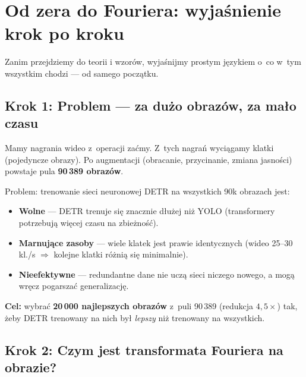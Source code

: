 
\section{Od zera do Fouriera: wyjaśnienie krok po kroku}
\label{sec:krok_po_kroku}

Zanim przejdziemy do teorii i wzorów, wyjaśnijmy prostym językiem o~co
w~tym wszystkim chodzi --- od samego początku.


\subsection{Krok 1: Problem --- za dużo obrazów, za mało czasu}
\label{sec:krok1}

Mamy nagrania wideo z~operacji zaćmy.  Z~tych nagrań wyciągamy klatki
(pojedyncze obrazy).  Po augmentacji (obracanie, przycinanie, zmiana jasności)
powstaje pula \textbf{90\,389 obrazów}.

Problem: trenowanie sieci neuronowej DETR na wszystkich 90k obrazach jest:
\begin{itemize}
    \item \textbf{Wolne} --- DETR trenuje się znacznie dłużej niż YOLO
          (transformery potrzebują więcej czasu na zbieżność).
    \item \textbf{Marnujące zasoby} --- wiele klatek jest prawie identycznych
          (wideo 25--30 kl./s $\Rightarrow$ kolejne klatki różnią się minimalnie).
    \item \textbf{Nieefektywne} --- redundantne dane nie uczą sieci niczego
          nowego, a mogą wręcz pogarszać generalizację.
\end{itemize}

\textbf{Cel:} wybrać \textbf{20\,000 najlepszych obrazów} z~puli 90\,389
(redukcja $4{,}5\times$) tak, żeby DETR trenowany na nich był \emph{lepszy}
niż trenowany na wszystkich.


\subsection{Krok 2: Czym jest transformata Fouriera na obrazie?}
\label{sec:krok2}

